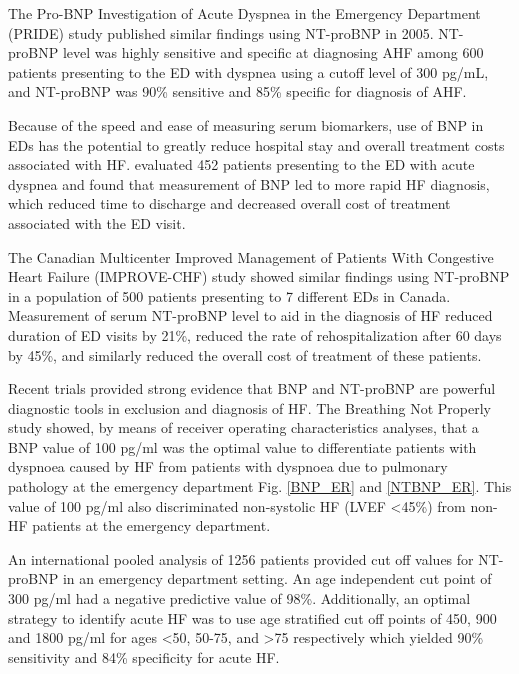 \documentclass[14pt,a4paper,onecolumn]{extarticle}
\begin{document}
The Pro-BNP Investigation of Acute Dyspnea in the Emergency Department (PRIDE) study published similar findings using NT-proBNP in 2005. NT-proBNP level was highly sensitive and specific at diagnosing AHF among 600 patients presenting to the ED with dyspnea using a cutoff level of 300 pg/mL, and NT-proBNP was 90\% sensitive and 85\% specific for diagnosis of AHF. \citep{Januzzi2005}  %

Because of the speed and ease of measuring serum biomarkers, use of BNP in EDs has the potential to greatly reduce hospital stay and overall treatment costs associated with HF. \citep{Mueller2004} evaluated 452 patients presenting to the ED with acute dyspnea and found that measurement of BNP led to more rapid HF diagnosis, which reduced time to discharge and decreased overall cost of treatment associated with the ED visit.  %

The Canadian Multicenter Improved Management of Patients With Congestive Heart Failure (IMPROVE-CHF) study showed similar findings using NT-proBNP in a population of 500 patients presenting to 7 different EDs in Canada. Measurement of serum NT-proBNP level to aid in the diagnosis of HF reduced duration of ED visits by 21\%, reduced the rate of rehospitalization after 60 days by 45\%, and similarly reduced the overall cost of treatment of these patients. \citep{Moe2007} %

Recent trials provided strong evidence that BNP and NT-proBNP are powerful diagnostic tools in exclusion and diagnosis of HF. The Breathing Not Properly study showed, by means of receiver operating characteristics analyses, that a BNP value of 100 pg/ml was the optimal value to differentiate patients with dyspnoea caused by HF from patients with dyspnoea due to pulmonary pathology at the emergency department Fig. \ref{BNP_ER} and \ref{NTBNP_ER}.  This value of 100 pg/ml also discriminated non-systolic HF (LVEF <45\%) from non-HF patients at the emergency department. \citep{Maisel2002}

An international pooled analysis of 1256 patients provided cut off values for NT-proBNP in an emergency department setting. An age independent cut point of 300 pg/ml had a negative predictive value of 98\%.  Additionally, an optimal strategy to identify acute HF was to use age stratified cut off points of 450, 900 and 1800 pg/ml for ages <50, 50-75, and >75 respectively which yielded 90\% sensitivity and 84\% specificity for acute HF. \citep{Januzzi2006a}
\end{document}
